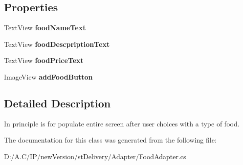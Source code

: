 \subsection*{Properties}
\begin{DoxyCompactItemize}
\item 
\mbox{\label{classst_delivery_1_1_adapter_1_1_food_adapter_view_holder_a80fe69669b3dd2d178de1c96879a2ccc}} 
Text\+View {\bfseries food\+Name\+Text}
\item 
\mbox{\label{classst_delivery_1_1_adapter_1_1_food_adapter_view_holder_adbe431e5976e21ecf3140bfb6ce81419}} 
Text\+View {\bfseries food\+Descpription\+Text}
\item 
\mbox{\label{classst_delivery_1_1_adapter_1_1_food_adapter_view_holder_ab27c5e9186b6596301ef2d372093c6a1}} 
Text\+View {\bfseries food\+Price\+Text}
\item 
\mbox{\label{classst_delivery_1_1_adapter_1_1_food_adapter_view_holder_ae74f310d3dd052a44c3b6767f8cd3b09}} 
Image\+View {\bfseries add\+Food\+Button}
\end{DoxyCompactItemize}


\subsection{Detailed Description}
In principle is for populate entire screen after user choices with a type of food. 



The documentation for this class was generated from the following file\+:\begin{DoxyCompactItemize}
\item 
D\+:/\+A.\+C/\+I\+P/new\+Version/st\+Delivery/\+Adapter/Food\+Adapter.\+cs\end{DoxyCompactItemize}
